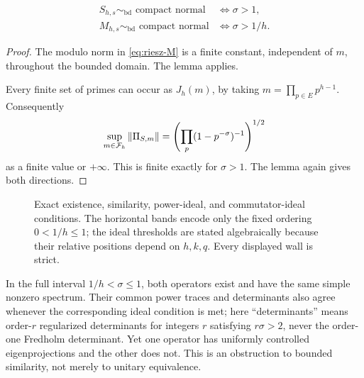 \begin{theorem}
\label{thm:similarity}
\begin{align*}
  S_{h,s}\sim_{\mathrm{bd}}\text{ compact normal}&\iff\sigma>1,\\
  M_{h,s}\sim_{\mathrm{bd}}\text{ compact normal}&\iff\sigma>1/h.
\end{align*}
\end{theorem}

\begin{proof}
The modulo norm in \cref{eq:riesz-M} is a finite constant, independent of
$m$, throughout the bounded domain.  The lemma applies.

Every finite set of primes can occur as $J_h(m)$, by taking
$m=\prod_{p\in E}p^{h-1}$.  Consequently
\[
  \sup_{m\in\mathcal F_h}\|\Pi_{S,m}\|
  =\left(\prod_p(1-p^{-\sigma})^{-1}\right)^{1/2}
\]
as a finite value or $+\infty$.  This is finite exactly for $\sigma>1$.
The lemma again gives both directions.
\end{proof}

\begin{figure}[t]
  \centering
  \resizebox{0.98\linewidth}{!}{}
  \caption{Exact existence, similarity, power-ideal, and commutator-ideal
  conditions.  The horizontal bands encode only the fixed ordering
  $0<1/h\le1$; the ideal thresholds are stated algebraically because their
  relative positions depend on $h,k,q$.  Every displayed wall is strict.}
  \label{fig:phase}
\end{figure}

In the full interval $1/h<\sigma\le1$, both operators exist and have the
same simple nonzero spectrum.  Their common power traces and determinants
also agree whenever the corresponding ideal condition is met; here
``determinants'' means order-$r$ regularized determinants for integers
$r$ satisfying $r\sigma>2$, never the order-one Fredholm determinant.  Yet one
operator has uniformly controlled eigenprojections and the other does not.
This is an obstruction to bounded similarity, not merely to unitary
equivalence.
